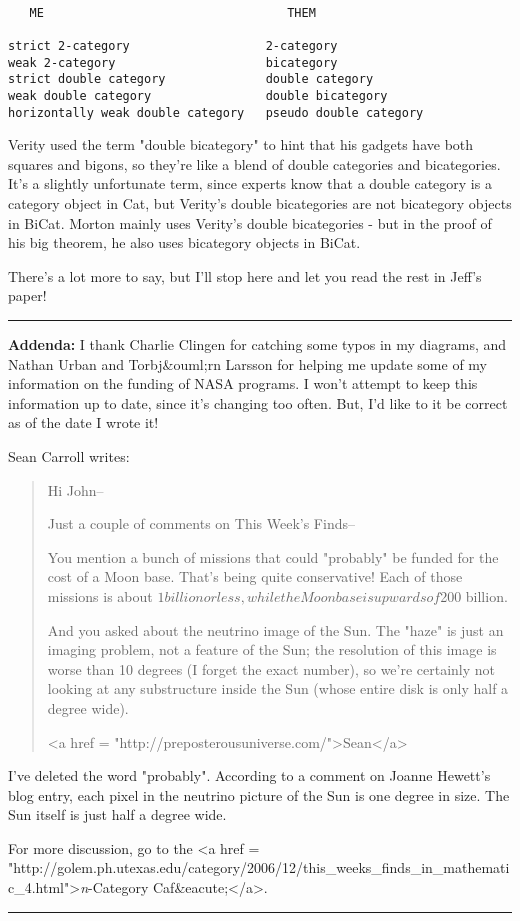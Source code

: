 \begin{verbatim}

   ME                                  THEM

strict 2-category                   2-category
weak 2-category                     bicategory
strict double category              double category
weak double category                double bicategory
horizontally weak double category   pseudo double category
\end{verbatim}
    

Verity used the term "double bicategory" to hint that his gadgets
have both squares and bigons, so they're like a blend of double 
categories and bicategories.  It's a slightly unfortunate term, since
experts know that a double category is a category object in Cat, but
Verity's double bicategories are not bicategory objects in BiCat.  
Morton mainly uses Verity's double bicategories - but in the proof of
his big theorem, he also uses bicategory objects in BiCat.  

There's a lot more to say, but I'll stop here and let you read
the rest in Jeff's paper!

\par\noindent\rule{\textwidth}{0.4pt}
\textbf{Addenda:} I thank Charlie Clingen for catching some typos
in my diagrams, and Nathan Urban and Torbj&ouml;rn Larsson for helping me
update some of my information on the funding of NASA programs.  I
won't attempt to keep this information up to date, since it's changing
too often.  But, I'd like to it be correct as of the date I wrote it!

Sean Carroll writes:

\begin{quote}
Hi John-- 

Just a couple of comments on This Week's Finds--

You mention a bunch of missions that could "probably" be funded for
the cost of a Moon base.  That's being quite conservative!  Each of
those missions is about $1 billion or less, while the Moon base is
upwards of $200 billion.

And you asked about the neutrino image of the Sun.  The "haze" is just
an imaging problem, not a feature of the Sun; the resolution of this
image is worse than 10 degrees (I forget the exact number), so we're
certainly not looking at any substructure inside the Sun (whose entire
disk is only half a degree wide).

<a href = "http://preposterousuniverse.com/">Sean</a>
\end{quote}

I've deleted the word "probably".  According to
a comment on Joanne Hewett's blog entry, each pixel in the
neutrino picture of the Sun is one degree in size.  The 
Sun itself is just half a degree wide.

For more discussion, go to the <a href = "http://golem.ph.utexas.edu/category/2006/12/this_weeks_finds_in_mathematic_4.html">\emph{n}-Category
Caf&eacute;</a>.

\par\noindent\rule{\textwidth}{0.4pt}
